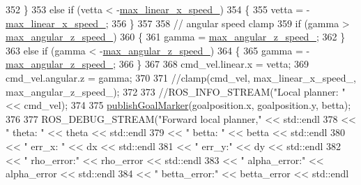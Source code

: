 \begin{DoxyCode}
{352     \}
353     \textcolor{keywordflow}{else} \textcolor{keywordflow}{if} (vetta < -\hyperlink{classcl__move__base__z_1_1forward__local__planner_1_1ForwardLocalPlanner_ab2e354dca208a2df60e905c9ee1fcd75}{max\_linear\_x\_speed\_})
354     \{
355         vetta = -\hyperlink{classcl__move__base__z_1_1forward__local__planner_1_1ForwardLocalPlanner_ab2e354dca208a2df60e905c9ee1fcd75}{max\_linear\_x\_speed\_};
356     \}
357 
358     \textcolor{comment}{// angular speed clamp}
359     \textcolor{keywordflow}{if} (gamma > \hyperlink{classcl__move__base__z_1_1forward__local__planner_1_1ForwardLocalPlanner_a198154e40443d46292d8eba1d81ad34f}{max\_angular\_z\_speed\_})
360     \{
361         gamma = \hyperlink{classcl__move__base__z_1_1forward__local__planner_1_1ForwardLocalPlanner_a198154e40443d46292d8eba1d81ad34f}{max\_angular\_z\_speed\_};
362     \}
363     \textcolor{keywordflow}{else} \textcolor{keywordflow}{if} (gamma < -\hyperlink{classcl__move__base__z_1_1forward__local__planner_1_1ForwardLocalPlanner_a198154e40443d46292d8eba1d81ad34f}{max\_angular\_z\_speed\_})
364     \{
365         gamma = -\hyperlink{classcl__move__base__z_1_1forward__local__planner_1_1ForwardLocalPlanner_a198154e40443d46292d8eba1d81ad34f}{max\_angular\_z\_speed\_};
366     \}
367 
368     cmd\_vel.linear.x = vetta;
369     cmd\_vel.angular.z = gamma;
370 
371     \textcolor{comment}{//clamp(cmd\_vel, max\_linear\_x\_speed\_, max\_angular\_z\_speed\_);}
372 
373     \textcolor{comment}{//ROS\_INFO\_STREAM("Local planner: "<< cmd\_vel);}
374 
375     \hyperlink{classcl__move__base__z_1_1forward__local__planner_1_1ForwardLocalPlanner_ae2ef5a1d00495eb7a6c22ec35ab8baf2}{publishGoalMarker}(goalposition.x, goalposition.y, betta);
376 
377     ROS\_DEBUG\_STREAM(\textcolor{stringliteral}{"Forward local planner,"} << std::endl
378                                               << \textcolor{stringliteral}{" theta: "} << theta << std::endl
379                                               << \textcolor{stringliteral}{" betta: "} << betta << std::endl
380                                               << \textcolor{stringliteral}{" err\_x: "} << dx << std::endl
381                                               << \textcolor{stringliteral}{" err\_y:"} << dy << std::endl
382                                               << \textcolor{stringliteral}{" rho\_error:"} << rho\_error << std::endl
383                                               << \textcolor{stringliteral}{" alpha\_error:"} << alpha\_error << std::endl
384                                               << \textcolor{stringliteral}{" betta\_error:"} << betta\_error << std::endl
}
\end{DoxyCode}
